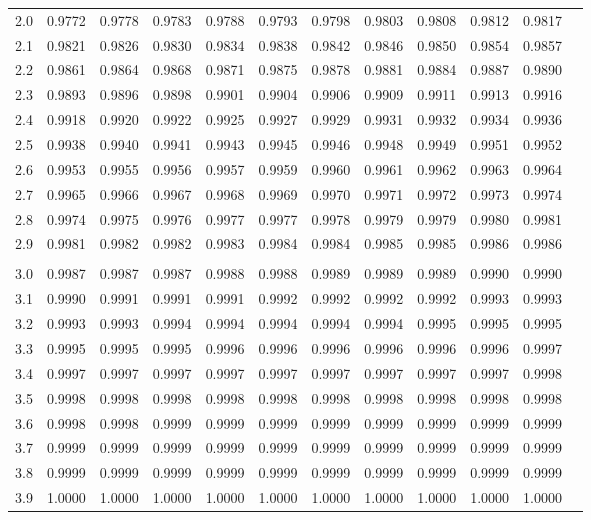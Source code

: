\documentclass[a4paper,12pt, twoside]{article}
\begin{document}
\begin{center}
\begin{tabular}{rr@{\ }r@{\ }r@{\ }r@{\ }r@{\ }r@{\ }r@{\ }r@{\ }r@{\ }r@{\ }r}
\\
2.0&0.9772&0.9778&0.9783&0.9788&0.9793&0.9798&0.9803&0.9808&0.9812&0.9817\\
2.1&0.9821&0.9826&0.9830&0.9834&0.9838&0.9842&0.9846&0.9850&0.9854&0.9857\\
2.2&0.9861&0.9864&0.9868&0.9871&0.9875&0.9878&0.9881&0.9884&0.9887&0.9890\\
2.3&0.9893&0.9896&0.9898&0.9901&0.9904&0.9906&0.9909&0.9911&0.9913&0.9916\\
2.4&0.9918&0.9920&0.9922&0.9925&0.9927&0.9929&0.9931&0.9932&0.9934&0.9936\\
2.5&0.9938&0.9940&0.9941&0.9943&0.9945&0.9946&0.9948&0.9949&0.9951&0.9952\\
2.6&0.9953&0.9955&0.9956&0.9957&0.9959&0.9960&0.9961&0.9962&0.9963&0.9964\\
2.7&0.9965&0.9966&0.9967&0.9968&0.9969&0.9970&0.9971&0.9972&0.9973&0.9974\\
2.8&0.9974&0.9975&0.9976&0.9977&0.9977&0.9978&0.9979&0.9979&0.9980&0.9981\\
2.9&0.9981&0.9982&0.9982&0.9983&0.9984&0.9984&0.9985&0.9985&0.9986&0.9986\\
\\
3.0&0.9987&0.9987&0.9987&0.9988&0.9988&0.9989&0.9989&0.9989&0.9990&0.9990\\
3.1&0.9990&0.9991&0.9991&0.9991&0.9992&0.9992&0.9992&0.9992&0.9993&0.9993\\
3.2&0.9993&0.9993&0.9994&0.9994&0.9994&0.9994&0.9994&0.9995&0.9995&0.9995\\
3.3&0.9995&0.9995&0.9995&0.9996&0.9996&0.9996&0.9996&0.9996&0.9996&0.9997\\
3.4&0.9997&0.9997&0.9997&0.9997&0.9997&0.9997&0.9997&0.9997&0.9997&0.9998\\
3.5&0.9998&0.9998&0.9998&0.9998&0.9998&0.9998&0.9998&0.9998&0.9998&0.9998\\
3.6&0.9998&0.9998&0.9999&0.9999&0.9999&0.9999&0.9999&0.9999&0.9999&0.9999\\
3.7&0.9999&0.9999&0.9999&0.9999&0.9999&0.9999&0.9999&0.9999&0.9999&0.9999\\
3.8&0.9999&0.9999&0.9999&0.9999&0.9999&0.9999&0.9999&0.9999&0.9999&0.9999\\
3.9&1.0000&1.0000&1.0000&1.0000&1.0000&1.0000&1.0000&1.0000&1.0000&1.0000\\
\end{tabular}
\end{center}

\end{document}
